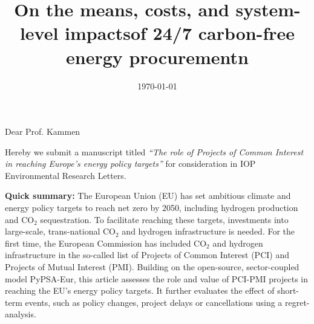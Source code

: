 \documentclass[10pt,a4paper,roman]{moderncv}        %
\title{On the means, costs, and system-level impactsof 24/7 carbon-free energy procurementn}
\begin{document}
\date{\today}
\opening{Dear Prof. Kammen}
\makelettertitle
\justifying
Hereby we submit a manuscript titled \textit{\enquote{The role of Projects of Common Interest in reaching Europe's energy policy targets}} for consideration in IOP Environmental Research Letters. 

\textbf{Quick summary:} The European Union (EU) has set ambitious climate and energy policy targets to reach net zero by 2050, including hydrogen production and CO$_2$ sequestration. To facilitate reaching these targets, investments into large-scale, trans-national CO$_2$ and hydrogen infrastructure is needed. For the first time, the European Commission has included CO$_2$ and hydrogen infrastructure in the so-called list of Projects of Common Interest (PCI) and Projects of Mutual Interest (PMI). Building on the open-source, sector-coupled model PyPSA-Eur, this article assesses the role and value of PCI-PMI projects in reaching the EU's energy policy targets. It further evaluates the effect of short-term events, such as policy changes, project delays or cancellations using a regret-analysis.
\end{document}
